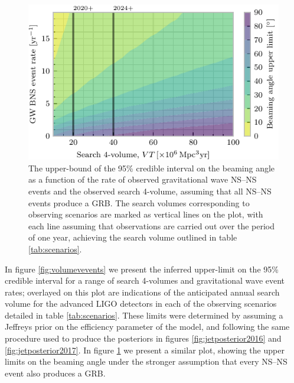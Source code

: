 \documentclass[twocolumn]{aastex61}
\newcommand{\BNS}{\ac{NS}--\ac{NS}\xspace}
\begin{document}
\begin{figure}
\centering
\includegraphics[width=\linewidth]{volume_v_nevents_e1.pdf}
\caption{\label{fig:volumeveventse1} The upper-bound of the 95\%
  credible interval on the beaming angle as a function of the rate of
  observed gravitational wave \BNS events and the observed search
  4-volume, assuming that all \BNS events produce a \ac{GRB}. The
  search volumes corresponding to observing scenarios are marked as
  vertical lines on the plot, with each line assuming that
  observations are carried out over the period of one year, achieving
  the search volume outlined in table \ref{tab:scenarios}.}
\end{figure}

In figure \ref{fig:volumevevents} we present the inferred upper-limit
on the 95\% credible interval for a range of search 4-volumes and
gravitational wave event rates; overlayed on this plot are indications
of the anticipated annual search volume for the advanced LIGO
detectors in each of the observing scenarios detailed in table
\ref{tab:scenarios}. These limits were determined by assuming a
Jeffreys prior on the efficiency parameter of the model, and following
the same procedure used to produce the posteriors in figures
\ref{fig:jetposterior2016} and \ref{fig:jetposterior2017}. In figure
\ref{fig:volumeveventse1} we present a similar plot, showing the upper
limits on the beaming angle under the stronger assumption that every
\BNS event also produces a \ac{GRB}.
\end{document}
